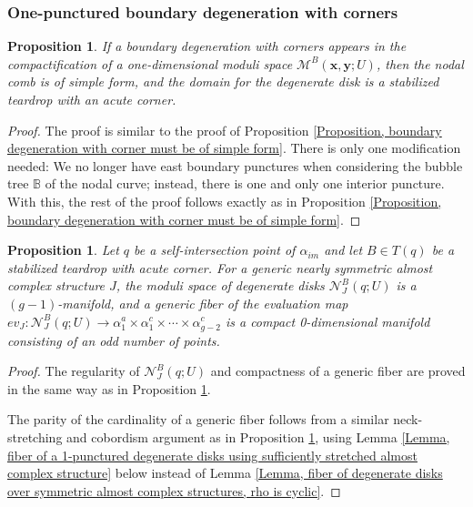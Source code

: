 \documentclass{amsart}
\newtheorem{prop}[thm]{Proposition}
\theoremstyle{definition}
\theoremstyle{remark}
\numberwithin{equation}{section}
\numberwithin{equation}{section} \makeatletter
\begin{document}
\subsubsection{One-punctured boundary degeneration with corners}
\begin{prop}\label{Proposition, one-punctured boundary degeneration with corneres must be of simple form}
If a boundary degeneration with corners appears in the compactification of a one-dimensional moduli space $\mathcal{M}^B(\bm{x},\bm{y};U)$, then the nodal comb is of simple form, and the domain for the degenerate disk is a stabilized teardrop with an acute corner. 
\end{prop}
\begin{proof}
The proof is similar to the proof of Proposition \ref{Proposition, boundary degeneration with corner must be of simple form}. There is only one modification needed: We no longer have east boundary punctures when considering the bubble tree $\mathbb{B}$ of the nodal curve; instead, there is one and only one interior puncture. With this, the rest of the proof follows exactly as in Proposition \ref{Proposition, boundary degeneration with corner must be of simple form}. 
\end{proof}

\begin{prop}\label{Proposition, fiber of evaluation map of 1-punctured degenerate disks is odd}
Let $q$ be a self-intersection point of $\alpha_{im}$ and let $B\in T(q)$ be a stabilized teardrop with acute corner. For a generic nearly symmetric almost complex structure $J$, the moduli space of degenerate disks $\mathcal{N}_J^B(q;U)$ is a $(g-1)$-manifold, and a generic fiber of the evaluation map $ev_J:\mathcal{N}_J^B(q;U)\rightarrow \alpha^a_1\times\alpha^c_1\times\cdots\times\alpha_{g-2}^c$ is a compact 0-dimensional manifold consisting of an odd number of points. 
\end{prop}

\begin{proof}
The regularity of $\mathcal{N}_J^B(q;U)$ and compactness of a generic fiber are proved in the same way as in Proposition \ref{Proposition, fiber of evaluation map of 1-punctured degenerate disks is odd}. 

The parity of the cardinality of a generic fiber follows from a similar neck-stretching and cobordism argument as in Proposition \ref{Proposition, fiber of evaluation map of 1-punctured degenerate disks is odd}, using Lemma \ref{Lemma, fiber of a 1-punctured degenerate disks using sufficiently stretched almost complex structure} below instead of Lemma \ref{Lemma, fiber of degenerate disks over symmetric almost complex structures, rho is cyclic}.
\end{proof}
\end{document}
